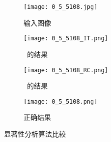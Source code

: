 \begin{figure}[ht]
  \centering%
  \begin{subfigure}{0.2\textwidth}
    \texttt{[image: 0\_5\_5108.jpg]}
    \caption{输入图像}
    \label{fig:saliencyInput}
  \end{subfigure}%
  \hspace{0.1in}%
  \begin{subfigure}{0.2\textwidth}
    \texttt{[image: 0\_5\_5108\_IT.png]}
    \caption{~的结果}
    \label{fig:ITRes}
  \end{subfigure}
  \hspace{0.05in}%
   \begin{subfigure}{0.2\textwidth}
    \texttt{[image: 0\_5\_5108\_RC.png]}
    \caption{~的结果}
    \label{fig:RCRes}
  \end{subfigure}
  \hspace{0.05in}%
   \begin{subfigure}{0.2\textwidth}
    \texttt{[image: 0\_5\_5108.png]}
    \caption{正确结果}
    \label{fig:GT}
  \end{subfigure}
  \hspace{0.05in}%
  \caption{显著性分析算法比较}
  \label{fig:SaliencyOverview}
\end{figure}



